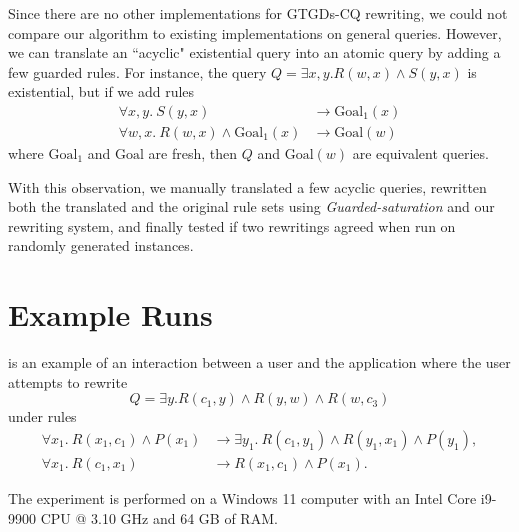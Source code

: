 \documentclass[12pt]{report}
\theoremstyle{plain}
\theoremstyle{definition}
\begin{document}
Since there are no other implementations for GTGDs-CQ rewriting, we could not compare our algorithm to existing implementations on general queries. However, we can translate an ``acyclic" existential query into an atomic query by adding a few guarded rules. For instance, the query $Q = \exists x, y. R(w, x) \wedge S(y, x)$ is existential, but if we add rules \begin{align*}
  \forall x, y.\ S(y, x) &\rightarrow \mathrm{Goal}_1(x) \\
  \forall w, x.\ R(w, x) \wedge \mathrm{Goal}_1(x) &\rightarrow \mathrm{Goal}(w)
\end{align*}
where $\mathrm{Goal}_1$ and $\mathrm{Goal}$ are fresh, then $Q$ and $\mathrm{Goal}(w)$ are equivalent queries.

With this observation, we manually translated a few acyclic queries, rewritten both the translated and the original rule sets using \emph{Guarded-saturation} and our rewriting system, and finally tested if two rewritings agreed when run on randomly generated instances.

\section{Example Runs}
\label{section:example-runs}

 is an example of an interaction between a user and the application where the user attempts to rewrite
$$
Q = \exists y. R(c_1, y) \wedge R(y, w) \wedge R(w, c_3)
$$
under rules
\begin{align*}
  \forall x_1.\ R(x_1, c_1) \wedge P(x_1) &\rightarrow \exists y_1.\ R(c_1, y_1) \wedge R(y_1, x_1) \wedge P(y_1), \\
  \forall x_1.\ R(c_1, x_1) &\rightarrow R(x_1, c_1) \wedge P(x_1).
\end{align*}

The experiment is performed on a Windows 11 computer with an Intel Core i9-9900 CPU @ 3.10 GHz and 64 GB of RAM.
\end{document}
